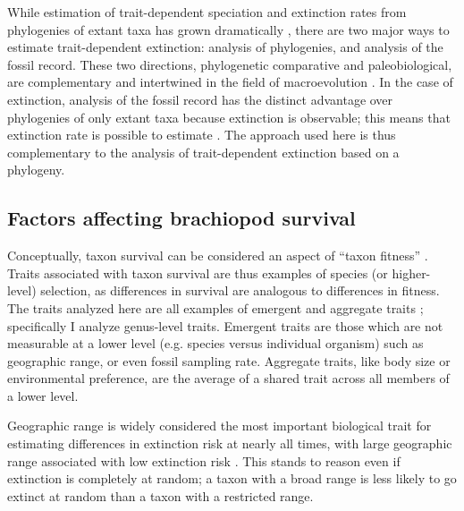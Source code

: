 \documentclass[11pt]{article}
\begin{document}
While estimation of trait-dependent speciation and extinction rates from phylogenies of extant taxa has grown dramatically \citep{Maddison2007,Fitzjohn2010,Goldberg2011a,Goldberg2005,Rabosky2013,Stadler2013b,Stadler2011a,Stadler2013a}, there are two major ways to estimate trait-dependent extinction: analysis of phylogenies, and analysis of the fossil record. These two directions, phylogenetic comparative and paleobiological, are complementary and intertwined in the field of macroevolution \citep{Rabosky2010b,Jablonski2008a,Hunt2014a}. In the case of extinction, analysis of the fossil record has the distinct advantage over phylogenies of only extant taxa because extinction is observable; this means that extinction rate is possible to estimate \citep{Rabosky2010a,Quental2009,Liow2010a}. The approach used here is thus complementary to the analysis of trait-dependent extinction based on a phylogeny.

\subsection*{Factors affecting brachiopod survival}

Conceptually, taxon survival can be considered an aspect of ``taxon fitness'' \citep{Cooper1984,Palmer2012}. Traits associated with taxon survival are thus examples of species (or higher-level) selection, as differences in survival are analogous to differences in fitness. The traits analyzed here are all examples of emergent and aggregate traits \citep{Jablonski2008a,Rabosky2010b}; specifically I analyze genus-level traits. Emergent traits are those which are not measurable at a lower level (e.g. species versus individual organism) such as geographic range, or even fossil sampling rate. Aggregate traits, like body size or environmental preference, are the average of a shared trait across all members of a lower level.

Geographic range is widely considered the most important biological trait for estimating differences in extinction risk at nearly all times, with large geographic range associated with low extinction risk \citep{Jablonski1986,Jablonski1987,Jablonski2003,Payne2007,Jablonski2008a,Harnik2013,Finnegan2012a}. This stands to reason even if extinction is completely at random; a taxon with a broad range is less likely to go extinct at random than a taxon with a restricted range.
\end{document}

